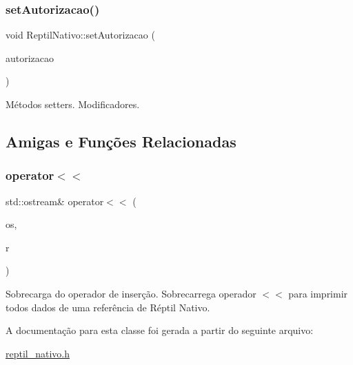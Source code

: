 \subsubsection{\texorpdfstring{set\+Autorizacao()}{setAutorizacao()}}
{\footnotesize\ttfamily void Reptil\+Nativo\+::set\+Autorizacao (\begin{DoxyParamCaption}\item[{std\+::string}]{autorizacao }\end{DoxyParamCaption})}

Métodos setters. Modificadores. 

\subsection{Amigas e Funções Relacionadas}
\mbox{\label{classReptilNativo_ae9107a41e5f55eee6b5a8acd1c135618}} 
\subsubsection{\texorpdfstring{operator$<$$<$}{operator<<}}
{\footnotesize\ttfamily std\+::ostream\& operator$<$$<$ (\begin{DoxyParamCaption}\item[{std\+::ostream \&}]{os,  }\item[{\hyperlink{classReptilNativo}{Reptil\+Nativo} \&}]{r }\end{DoxyParamCaption})\hspace{0.3cm}{\ttfamily [friend]}}

Sobrecarga do operador de inserção. Sobrecarrega operador $<$$<$ para imprimir todos dados de uma referência de Réptil Nativo. 

A documentação para esta classe foi gerada a partir do seguinte arquivo\+:\begin{DoxyCompactItemize}
\item 
\hyperlink{reptil__nativo_8h}{reptil\+\_\+nativo.\+h}\end{DoxyCompactItemize}
